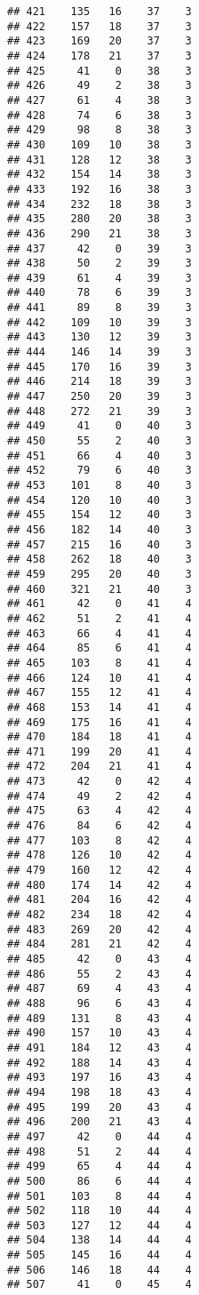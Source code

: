 \documentclass[
]{article}
\begin{document}
\begin{verbatim}
## 421    135   16    37    3
## 422    157   18    37    3
## 423    169   20    37    3
## 424    178   21    37    3
## 425     41    0    38    3
## 426     49    2    38    3
## 427     61    4    38    3
## 428     74    6    38    3
## 429     98    8    38    3
## 430    109   10    38    3
## 431    128   12    38    3
## 432    154   14    38    3
## 433    192   16    38    3
## 434    232   18    38    3
## 435    280   20    38    3
## 436    290   21    38    3
## 437     42    0    39    3
## 438     50    2    39    3
## 439     61    4    39    3
## 440     78    6    39    3
## 441     89    8    39    3
## 442    109   10    39    3
## 443    130   12    39    3
## 444    146   14    39    3
## 445    170   16    39    3
## 446    214   18    39    3
## 447    250   20    39    3
## 448    272   21    39    3
## 449     41    0    40    3
## 450     55    2    40    3
## 451     66    4    40    3
## 452     79    6    40    3
## 453    101    8    40    3
## 454    120   10    40    3
## 455    154   12    40    3
## 456    182   14    40    3
## 457    215   16    40    3
## 458    262   18    40    3
## 459    295   20    40    3
## 460    321   21    40    3
## 461     42    0    41    4
## 462     51    2    41    4
## 463     66    4    41    4
## 464     85    6    41    4
## 465    103    8    41    4
## 466    124   10    41    4
## 467    155   12    41    4
## 468    153   14    41    4
## 469    175   16    41    4
## 470    184   18    41    4
## 471    199   20    41    4
## 472    204   21    41    4
## 473     42    0    42    4
## 474     49    2    42    4
## 475     63    4    42    4
## 476     84    6    42    4
## 477    103    8    42    4
## 478    126   10    42    4
## 479    160   12    42    4
## 480    174   14    42    4
## 481    204   16    42    4
## 482    234   18    42    4
## 483    269   20    42    4
## 484    281   21    42    4
## 485     42    0    43    4
## 486     55    2    43    4
## 487     69    4    43    4
## 488     96    6    43    4
## 489    131    8    43    4
## 490    157   10    43    4
## 491    184   12    43    4
## 492    188   14    43    4
## 493    197   16    43    4
## 494    198   18    43    4
## 495    199   20    43    4
## 496    200   21    43    4
## 497     42    0    44    4
## 498     51    2    44    4
## 499     65    4    44    4
## 500     86    6    44    4
## 501    103    8    44    4
## 502    118   10    44    4
## 503    127   12    44    4
## 504    138   14    44    4
## 505    145   16    44    4
## 506    146   18    44    4
## 507     41    0    45    4

\end{verbatim}
\end{document}
